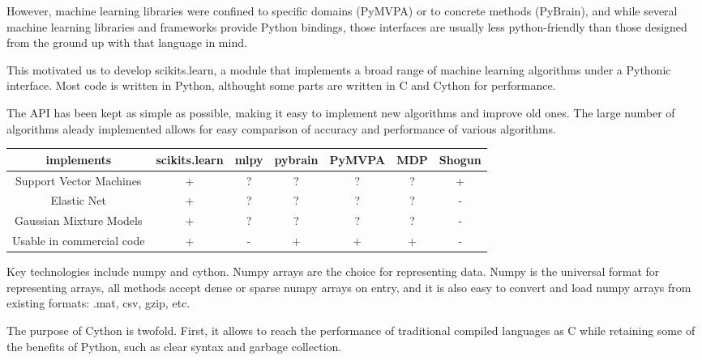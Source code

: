 \documentclass[twoside,11pt]{article}
\begin{document}
However, machine learning libraries were confined to specific domains
(PyMVPA) or to concrete methods (PyBrain), and while several machine
learning libraries and frameworks provide Python bindings, those
interfaces are usually less python-friendly than those designed
from the ground up with that language in mind.



This motivated us to develop scikits.learn, a module that implements a
broad range of machine learning algorithms under a Pythonic
interface. Most code is written in Python, althought some parts are
written in C and Cython for performance.

The API has been kept as simple as possible, making it easy to
implement new algorithms and improve old ones. The large number of
algorithms aleady implemented allows for easy comparison of accuracy
and performance of various algorithms.


\begin{center}


\begin{tabular}{c c c c c c c}
\hline\hline %
implements & scikits.learn & mlpy & pybrain & PyMVPA &  MDP & Shogun \\ [0.5ex]
\hline
Support Vector Machines        & + & ?   & ?       &  ?     & ?    & + \\
Elastic Net & + & ?   & ?       &  ?     & ?    & - \\
Gaussian Mixture Models  & + & ?   & ?       &  ?     & ?    & - \\
Usable in commercial code &  + & -   & +       &  +     & +    & - \\
\hline
\end{tabular}
\end{center}


Key technologies include numpy and cython. Numpy arrays are the choice for
representing data. Numpy is the universal format for representing
arrays, all methods accept dense or sparse numpy arrays on entry, and
it is also easy to convert and load numpy arrays from existing formats:
.mat, csv, gzip, etc.

The purpose of Cython is twofold. First, it allows to reach the
performance of traditional compiled languages as C while retaining
some of the benefits of Python, such as clear syntax and garbage
collection.
\end{document}

